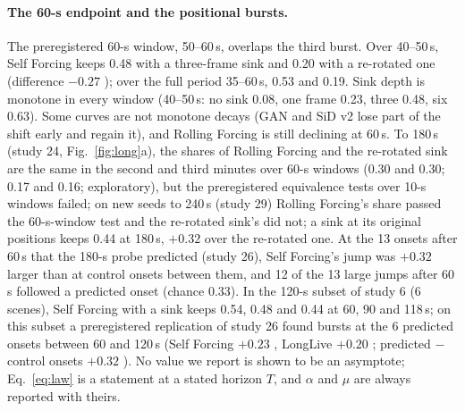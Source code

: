 \paragraph{The 60-s endpoint and the positional bursts.} The preregistered 60-s window, 50--60\,s, overlaps the
third burst. Over 40--50\,s, Self Forcing keeps 0.48 with a three-frame sink and 0.20 with a re-rotated one (difference
$-0.27$ ); over the full period 35--60\,s, 0.53 and 0.19. Sink depth is monotone in every window
(40--50\,s: no sink 0.08, one frame 0.23, three 0.48, six 0.63). Some curves are not monotone decays (GAN and SiD v2 lose
part of the shift early and regain it), and Rolling Forcing is still declining at 60\,s. To 180\,s (study 24, Fig.~\ref{fig:long}a),
the shares of Rolling Forcing and the re-rotated sink are the same in the second and third minutes over 60-s windows
(0.30 and 0.30; 0.17 and 0.16; exploratory), but the preregistered equivalence tests over 10-s windows failed;
on new seeds to 240\,s (study 29) Rolling Forcing's share passed the 60-s-window test and the re-rotated sink's did not; a
sink at its original positions keeps 0.44 at 180\,s, $+0.32$  over the re-rotated one. At the 13
onsets after 60\,s that the 180-s probe predicted (study 26), Self Forcing's jump was $+0.32$  larger
than at control onsets between them, and 12 of the 13 large jumps after 60\,s followed a predicted onset (chance
0.33). In the 120-s
subset of study 6 (6 scenes), Self Forcing with a sink keeps 0.54, 0.48 and 0.44 at 60, 90 and 118\,s; on this subset
a preregistered replication of study 26 found bursts at the 6 predicted onsets between 60 and 120\,s (Self Forcing
$+0.23$ , LongLive $+0.20$ ; predicted $-$ control onsets $+0.32$ ).
No value we report is shown to be an asymptote; Eq.~\ref{eq:law} is a statement at a stated horizon $T$, and
$\alpha$ and $\mu$ are always reported with theirs.

